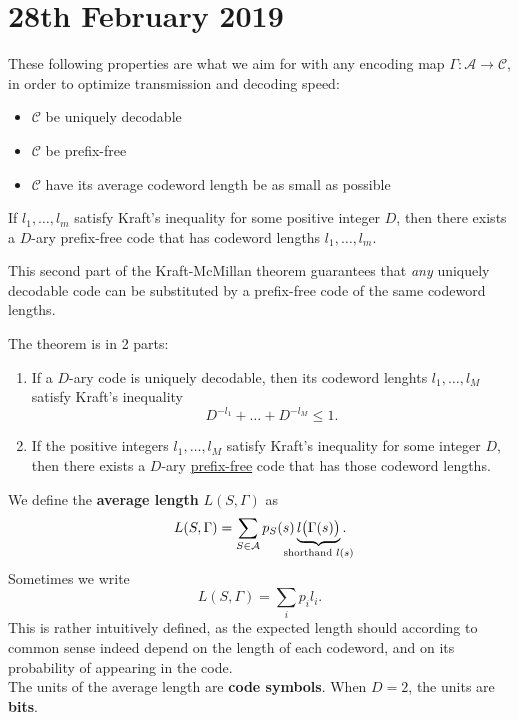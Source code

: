 \documentclass{report}
\begin{document}
\section{28th February 2019}

These following properties are what we aim for with any encoding map $\Gamma : \mathcal A \to \mathcal C$, in order to optimize transmission and decoding speed:
\begin{itemize}
	\item $\mathcal C$ be uniquely decodable
	\item $\mathcal C$ be prefix-free
	\item $\mathcal C$ have its average codeword length be as small as possible
\end{itemize}

\begin{thm}
If $l_1, \ldots, l_m$ satisfy Kraft's inequality for some positive integer $D$, then there exists a $D$-ary prefix-free code that has codeword  lengths $l_1, \ldots, l_m$.
\end{thm}

This second part of the Kraft-McMillan theorem guarantees that \emph{any} uniquely decodable code can be substituted by a prefix-free code of the same codeword lengths.
\begin{summary} The theorem is in 2 parts:
	\begin{enumerate}
		\item If a $D$-ary code is uniquely decodable, then its codeword lenghts $l_1, \ldots, l_M$ satisfy Kraft's inequality
		\begin{equation*}
		D^{-l_1} + \dots + D^{-l_M} \leq 1.
		\end{equation*}
		\item If the positive integers $l_1, \ldots, l_M$ satisfy Kraft's inequality for some integer $D$, then there exists a $D$-ary \ul{prefix-free} code that has those codeword lengths.
	\end{enumerate}
\end{summary}

\begin{defn}
We define the \textbf{average length} $L(S, \Gamma)$ as
	\begin{equation}
		L(S, \Gamma) = \sum_{S \in \mathcal A} p_S(s) \underbrace{l \bigl(\Gamma(s)\bigr)}_{{\mathclap{\text{shorthand } l(s)}}}.
	\end{equation}
	Sometimes we write
	\begin{equation}
		L(S, \Gamma) = \sum_i p_i l_i.
	\end{equation}
This is rather intuitively defined, as the expected length should according to common sense indeed depend on the length of each codeword, and on its probability of appearing in the code. \\
The units of the average length are \textbf{code symbols}. When $D = 2$, the units are \textbf{bits}.
\end{defn}
\end{document}
